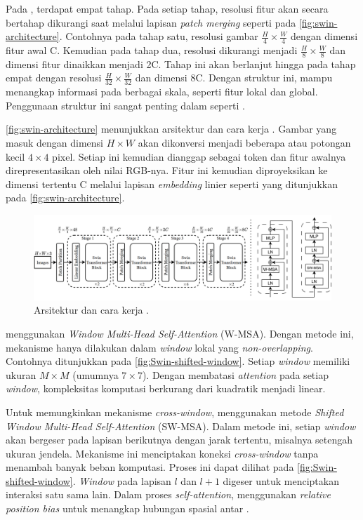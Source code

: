 Pada \swin, terdapat empat tahap. Pada setiap tahap, resolusi fitur akan secara bertahap dikurangi saat melalui lapisan \emph{patch merging} seperti pada \autoref{fig:swin-architecture}. Contohnya pada tahap satu, resolusi gambar $\frac{H}{4} \times \frac{W}{4}$ dengan dimensi fitur awal C. Kemudian pada tahap dua, resolusi dikurangi menjadi $\frac{H}{8} \times \frac{W}{8}$ dan 
dimensi fitur dinaikkan menjadi 2C. Tahap ini akan berlanjut hingga pada tahap empat dengan resolusi $\frac{H}{32} \times \frac{W}{32}$ dan dimensi 8C. Dengan struktur ini, \swin{} mampu menangkap informasi pada berbagai skala, seperti fitur lokal dan global. Penggunaan struktur ini sangat penting dalam \cv{} seperti \objectdetection. 

\autoref{fig:swin-architecture} menunjukkan arsitektur dan cara kerja \swin. Gambar yang masuk dengan dimensi $H \times W$ akan dikonversi menjadi beberapa \patch{} atau potongan kecil $4 \times 4$ pixel. Setiap \patch{} ini kemudian dianggap sebagai token dan fitur awalnya direpresentasikan oleh nilai RGB-nya. Fitur ini kemudian 
diproyeksikan ke dimensi tertentu C melalui lapisan \emph{embedding} linier seperti yang ditunjukkan pada \autoref{fig:swin-architecture}.

\begin{figure}[htbp]
    \centering
    \includegraphics[width=1\textwidth]{images/swin-architecture.png}
    \caption{Arsitektur dan cara kerja \swin{} \parencite{liu2021swin}.}
    \label{fig:swin-architecture}
\end{figure}

\swin{} menggunakan \emph{Window Multi-Head Self-Attention} (W-MSA). Dengan metode ini, mekanisme \selfattention{} hanya dilakukan dalam \emph{window} lokal yang \emph{non-overlapping}. Contohnya ditunjukkan pada \autoref{fig:Swin-shifted-window}. 
Setiap \emph{window} memiliki ukuran $M \times M$ (umumnya $7 \times 7$). Dengan membatasi \emph{attention} pada setiap \emph{window}, kompleksitas komputasi berkurang dari kuadratik menjadi linear.

Untuk memungkinkan mekanisme \emph{cross-window}, \swin{} menggunakan metode \emph{Shifted Window Multi-Head Self-Attention} (SW-MSA). Dalam metode ini, setiap \emph{window} akan bergeser pada lapisan berikutnya dengan jarak tertentu, misalnya setengah ukuran jendela. Mekanisme ini menciptakan koneksi \emph{cross-window} tanpa menambah banyak beban komputasi. Proses ini dapat dilihat pada \autoref{fig:Swin-shifted-window}. \emph{Window} pada lapisan $l$ dan $l+1$ digeser untuk menciptakan interaksi satu sama lain. Dalam proses \emph{self-attention}, \swin{} menggunakan \textit{relative position bias} untuk menangkap hubungan spasial antar \patch.
